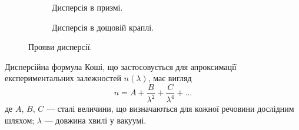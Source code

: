 \begin{figure}[h!]\centering
	\begin{subfigure}{0.45\linewidth}
		
		\caption{Дисперсія в призмі.}
		\label{pic:Prism_dispersion}
	\end{subfigure}
	\begin{subfigure}{0.45\linewidth}
		
		\caption{Дисперсія в дощовій краплі.}
		\label{pic:Droplet_dispersion}
	\end{subfigure}
	\caption{Прояви дисперсії.}
	\label{pic:dispersion}
\end{figure}

Дисперсійна формула Коші, що застосовується для апроксимації
експериментальних залежностей $n(\lambda)$, має вигляд
\begin{equation}\label{eq:Cauchi_dispersion}
	n = A + \frac{B}{\lambda^2} + \frac{C}{\lambda^4} + \ldots
\end{equation}
де $A$, $B$, $C$ --- сталі величини, що визначаються для кожної речовини
дослідним шляхом; $\lambda$ --- довжина хвилі у вакуумі.








%    


